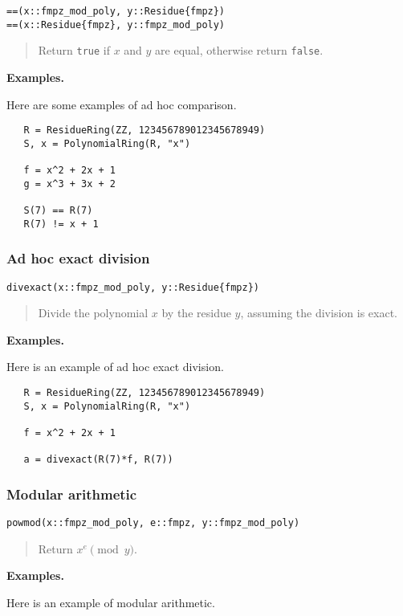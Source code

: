 \documentclass[a4paper,10pt]{article}
\newcommand{\code}{\lstinline}
\newcommand{\desc}[1]{\vspace{-3mm}\begin{quote}#1\end{quote}}
\begin{document}
{{\begin{lstlisting}
==(x::fmpz_mod_poly, y::Residue{fmpz})
==(x::Residue{fmpz}, y::fmpz_mod_poly)
\end{lstlisting}

\desc{Return \code{true} if $x$ and $y$ are equal, otherwise return \code{false}.}

\textbf{Examples.}

Here are some examples of ad hoc comparison.

\begin{lstlisting}
   R = ResidueRing(ZZ, 123456789012345678949)
   S, x = PolynomialRing(R, "x")

   f = x^2 + 2x + 1
   g = x^3 + 3x + 2

   S(7) == R(7)
   R(7) != x + 1
\end{lstlisting}

\subsubsection{Ad hoc exact division}

\begin{lstlisting}
divexact(x::fmpz_mod_poly, y::Residue{fmpz})
\end{lstlisting}

\desc{Divide the polynomial $x$ by the residue $y$, assuming the division is exact.}

\textbf{Examples.}

Here is an example of ad hoc exact division.

\begin{lstlisting}
   R = ResidueRing(ZZ, 123456789012345678949)
   S, x = PolynomialRing(R, "x")

   f = x^2 + 2x + 1
   
   a = divexact(R(7)*f, R(7)) 
\end{lstlisting}

\subsubsection{Modular arithmetic}

\begin{lstlisting}
powmod(x::fmpz_mod_poly, e::fmpz, y::fmpz_mod_poly)
\end{lstlisting}

\desc{Return $x^e \pmod{y}$.}

\textbf{Examples.}

Here is an example of modular arithmetic.

}}
\end{document}
